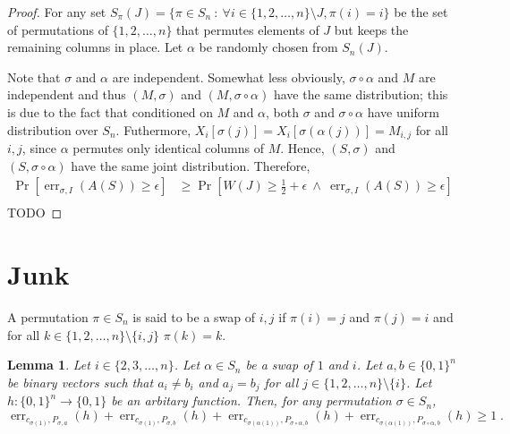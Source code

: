 \documentclass[10pt]{article}
\newtheorem{lemma}[proposition]{Lemma}
\DeclareMathOperator{\err}{err}
\begin{document}
\begin{proof}
For any set $S_\pi(J) = \{ \pi \in S_n ~:~ \forall i \in \{1,2,\dots,n\}
\setminus J, \pi(i) = i \}$ be the set of permutations of $\{1,2,\dots,n\}$ that
permutes elements of $J$ but keeps the remaining columns in place. Let $\alpha$
be randomly chosen from $S_n(J)$.

Note that $\sigma$ and $\alpha$ are independent. Somewhat less obviously,
$\sigma \circ \alpha$ and $M$ are independent and thus $(M,\sigma)$ and $(M,
\sigma \circ \alpha)$ have the same distribution; this is due to the fact that
conditioned on $M$ and $\alpha$, both $\sigma$ and $\sigma \circ \alpha$ have uniform
distribution over $S_n$. Futhermore, $X_i[\sigma(j)] = X_i[\sigma(\alpha(j))] =
M_{i,j}$ for all $i,j$, since $\alpha$ permutes only identical columns of $M$.
Hence, $(S,\sigma)$ and $(S,\sigma \circ \alpha)$ have the same joint
distribution. Therefore,
\begin{align*}
\Pr \left[ \err_{\sigma,I}(A(S)) \ge \epsilon \right]
& \ge \Pr \left[ W(J) \ge \tfrac{1}{2} + \epsilon \ \wedge \ \err_{\sigma,I}(A(S)) \ge \epsilon \right] \\
\end{align*}
TODO
\end{proof}

\section{Junk}

A permutation $\pi \in S_n$ is said to be a swap of $i,j$
if $\pi(i) = j$ and $\pi(j) = i$ and for all $k \in \{1,2,\dots,n\} \setminus \{i,j\}$
$\pi(k) = k$.

\begin{lemma}
\label{lemma:projection-distances}
Let $i \in \{2,3,\dots,n\}$. Let $\alpha \in S_n$ be a swap of $1$ and $i$.
Let $a,b \in \{0,1\}^n$ be binary vectors such that $a_i \neq b_i$
and $a_j = b_j$ for all $j \in \{1,2,\dots,n\} \setminus \{i\}$.
Let $h:\{0,1\}^n \to \{0,1\}$ be an arbitary function. Then, for any permutation $\sigma \in S_n$,
$$
\err_{c_{\sigma(1)},P_{\sigma,a}}(h) + \err_{c_{\sigma(1)},P_{\sigma,b}}(h) +
\err_{c_{\sigma(\alpha(1))},P_{\sigma \circ \alpha,b}}(h) + \err_{c_{\sigma(\alpha(1))},P_{\sigma \circ \alpha,b}}(h) \ge 1 \; .
$$
\end{lemma}
\end{document}
